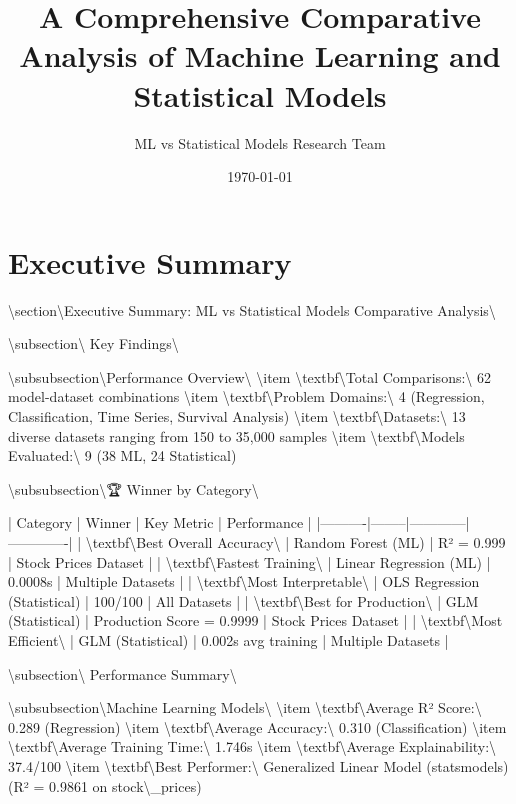 \documentclass[11pt,a4paper]{article}
\title{A Comprehensive Comparative Analysis of Machine Learning and Statistical Models}
\author{ML vs Statistical Models Research Team}
\date{\today}
\begin{document}
\maketitle

\tableofcontents
\newpage

\section{Executive Summary}
\textbackslash{}section\textbackslash{}{Executive Summary: ML vs Statistical Models Comparative Analysis\textbackslash{}}

\textbackslash{}subsection\textbackslash{}{ Key Findings\textbackslash{}}

\textbackslash{}subsubsection\textbackslash{}{Performance Overview\textbackslash{}}
\textbackslash{}item \textbackslash{}textbf\textbackslash{}{Total Comparisons:\textbackslash{}} 62 model-dataset combinations
\textbackslash{}item \textbackslash{}textbf\textbackslash{}{Problem Domains:\textbackslash{}} 4 (Regression, Classification, Time Series, Survival Analysis)
\textbackslash{}item \textbackslash{}textbf\textbackslash{}{Datasets:\textbackslash{}} 13 diverse datasets ranging from 150 to 35,000 samples
\textbackslash{}item \textbackslash{}textbf\textbackslash{}{Models Evaluated:\textbackslash{}} 9 (38 ML, 24 Statistical)

\textbackslash{}subsubsection\textbackslash{}{🏆 Winner by Category\textbackslash{}}

| Category | Winner | Key Metric | Performance |
|----------|--------|------------|-------------|
| \textbackslash{}textbf\textbackslash{}{Best Overall Accuracy\textbackslash{}} | Random Forest (ML) | R² = 0.999 | Stock Prices Dataset |
| \textbackslash{}textbf\textbackslash{}{Fastest Training\textbackslash{}} | Linear Regression (ML) | 0.0008s | Multiple Datasets |
| \textbackslash{}textbf\textbackslash{}{Most Interpretable\textbackslash{}} | OLS Regression (Statistical) | 100/100 | All Datasets |
| \textbackslash{}textbf\textbackslash{}{Best for Production\textbackslash{}} | GLM (Statistical) | Production Score = 0.9999 | Stock Prices Dataset |
| \textbackslash{}textbf\textbackslash{}{Most Efficient\textbackslash{}} | GLM (Statistical) | 0.002s avg training | Multiple Datasets |

\textbackslash{}subsection\textbackslash{}{ Performance Summary\textbackslash{}}

\textbackslash{}subsubsection\textbackslash{}{Machine Learning Models\textbackslash{}}
\textbackslash{}item \textbackslash{}textbf\textbackslash{}{Average R² Score:\textbackslash{}} 0.289 (Regression)
\textbackslash{}item \textbackslash{}textbf\textbackslash{}{Average Accuracy:\textbackslash{}} 0.310 (Classification)
\textbackslash{}item \textbackslash{}textbf\textbackslash{}{Average Training Time:\textbackslash{}} 1.746s
\textbackslash{}item \textbackslash{}textbf\textbackslash{}{Average Explainability:\textbackslash{}} 37.4/100
\textbackslash{}item \textbackslash{}textbf\textbackslash{}{Best Performer:\textbackslash{}} Generalized Linear Model (statsmodels) (R² = 0.9861 on stock\textbackslash{}_prices)
\end{document}
